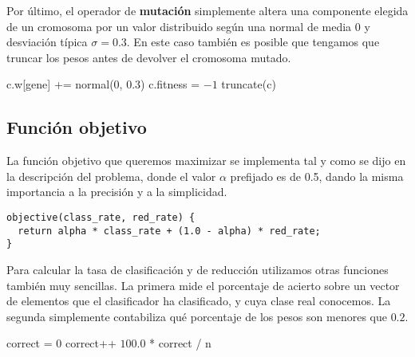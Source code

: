 \documentclass[12pt]{article}
\begin{document}
Por último, el operador de \textbf{mutación} simplemente altera una componente elegida de un cromosoma por un valor distribuido según una normal de media $0$ y desviación típica $\sigma = 0.3$. En este caso también es posible que tengamos que truncar los pesos antes de devolver el cromosoma mutado.


\begin{algorithm}[ht!]
\begin{algorithmic}

    \State c.w[gene] += normal($0$, $0.3$)
    \State c.fitness = $-1$  
    \State truncate(c)
    \State {}
\EndFunction

\end{algorithmic}
\end{algorithm}

\vspace{-1.5em}

\subsection*{{\color{red}Función objetivo}}

La función objetivo que queremos maximizar se implementa tal y como se dijo en la descripción del problema, donde el valor $\alpha$ prefijado es de 0.5, dando la misma importancia a la precisión y a la simplicidad.

\begin{verbatim}
objective(class_rate, red_rate) {
  return alpha * class_rate + (1.0 - alpha) * red_rate;
}
\end{verbatim}

Para calcular la tasa de clasificación y de reducción utilizamos otras funciones también muy sencillas. La primera mide el porcentaje de acierto sobre un vector de elementos que el clasificador ha clasificado, y cuya clase real conocemos. La segunda simplemente contabiliza qué porcentaje de los pesos son menores que $0.2$.

\begin{algorithm}[h!]
\begin{algorithmic}

    \State correct = $0$
      
            \State correct++
        \EndIf
    \EndFor
    \State \Return $100.0$ * correct / n
\EndFunction
  
\end{algorithmic}
\end{algorithm}
\end{document}
